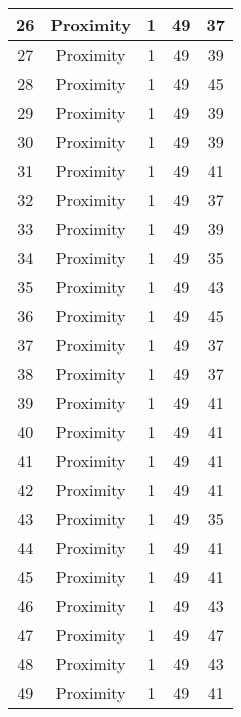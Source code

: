 \documentclass[results.tex]{subfiles}
\begin{document}
\begin{center}
\begin{tabular}{| c || c | c | c | c |}
    \hline
    26 & Proximity & 1 & 49 & 37 \\ 
    \hline
    27 & Proximity & 1 & 49 & 39 \\ 
    \hline
    28 & Proximity & 1 & 49 & 45 \\ 
    \hline
    29 & Proximity & 1 & 49 & 39 \\ 
    \hline
    30 & Proximity & 1 & 49 & 39 \\ 
    \hline
    31 & Proximity & 1 & 49 & 41 \\ 
    \hline
    32 & Proximity & 1 & 49 & 37 \\ 
    \hline
    33 & Proximity & 1 & 49 & 39 \\ 
    \hline
    34 & Proximity & 1 & 49 & 35 \\ 
    \hline
    35 & Proximity & 1 & 49 & 43 \\ 
    \hline
    36 & Proximity & 1 & 49 & 45 \\ 
    \hline
    37 & Proximity & 1 & 49 & 37 \\ 
    \hline
    38 & Proximity & 1 & 49 & 37 \\ 
    \hline
    39 & Proximity & 1 & 49 & 41 \\ 
    \hline
    40 & Proximity & 1 & 49 & 41 \\ 
    \hline
    41 & Proximity & 1 & 49 & 41 \\ 
    \hline
    42 & Proximity & 1 & 49 & 41 \\ 
    \hline
    43 & Proximity & 1 & 49 & 35 \\ 
    \hline
    44 & Proximity & 1 & 49 & 41 \\ 
    \hline
    45 & Proximity & 1 & 49 & 41 \\ 
    \hline
    46 & Proximity & 1 & 49 & 43 \\ 
    \hline
    47 & Proximity & 1 & 49 & 47 \\ 
    \hline
    48 & Proximity & 1 & 49 & 43 \\ 
    \hline
    49 & Proximity & 1 & 49 & 41 \\ 
    \hline   \end{tabular}
\end{center}
\end{document}
